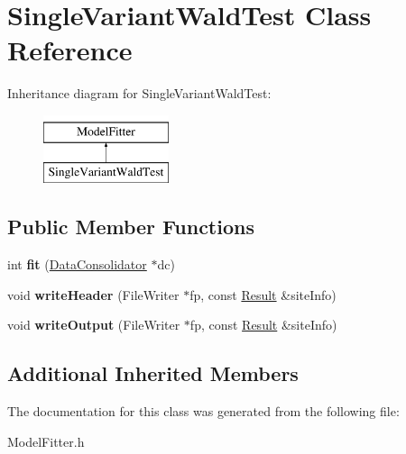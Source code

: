 \hypertarget{classSingleVariantWaldTest}{\section{Single\-Variant\-Wald\-Test Class Reference}
\label{classSingleVariantWaldTest}
}
Inheritance diagram for Single\-Variant\-Wald\-Test\-:\begin{figure}[H]
\begin{center}
\leavevmode
\includegraphics[height=2.000000cm]{classSingleVariantWaldTest}
\end{center}
\end{figure}
\subsection*{Public Member Functions}
\begin{DoxyCompactItemize}
\item 
\hypertarget{classSingleVariantWaldTest_a5ebe41360afa081a20d2daf4ec6d5eee}{int {\bfseries fit} (\hyperlink{classDataConsolidator}{Data\-Consolidator} $\ast$dc)}\label{classSingleVariantWaldTest_a5ebe41360afa081a20d2daf4ec6d5eee}

\item 
\hypertarget{classSingleVariantWaldTest_a25129546a6d70790213cf925a675691a}{void {\bfseries write\-Header} (File\-Writer $\ast$fp, const \hyperlink{classResult}{Result} \&site\-Info)}\label{classSingleVariantWaldTest_a25129546a6d70790213cf925a675691a}

\item 
\hypertarget{classSingleVariantWaldTest_afad368d8a7ab642e64260c4fe9daaf9a}{void {\bfseries write\-Output} (File\-Writer $\ast$fp, const \hyperlink{classResult}{Result} \&site\-Info)}\label{classSingleVariantWaldTest_afad368d8a7ab642e64260c4fe9daaf9a}

\end{DoxyCompactItemize}
\subsection*{Additional Inherited Members}


The documentation for this class was generated from the following file\-:\begin{DoxyCompactItemize}
\item 
Model\-Fitter.\-h\end{DoxyCompactItemize}
